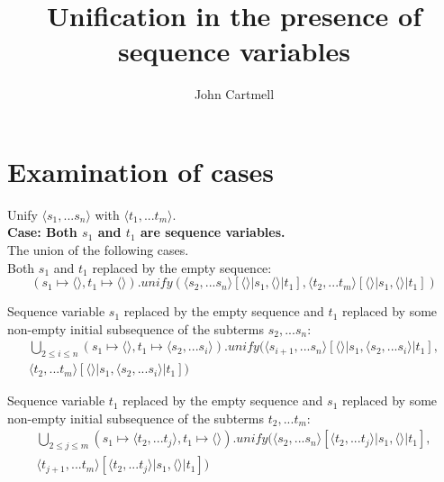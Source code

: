 \documentclass[10pt,a4paper,fleqn]{article}
\title{Unification in the presence of sequence variables}
\author{John Cartmell}
\begin{document}
\maketitle


\section{Examination of cases}

Unify $\langle s_1,...s_n \rangle$ with  $\langle t_1,...t_m \rangle$. \\

\noindent
\textbf{Case: Both $s_1$  and $t_1$ are sequence variables.} \\

\noindent
The union of the following cases. \\

\noindent
Both $s_1$ and $t_1$  replaced by the empty sequence:
\begin{equation}
\label{s1emptyt1empty}
 (s_1 \mapsto \langle \rangle,t_1 \mapsto \langle \rangle)
      .unify(\langle s_2,...s_n \rangle[\langle \rangle|s_1, \langle \rangle|t_1],
             \langle t_2,...t_m \rangle[\langle \rangle|s_1, \langle \rangle|t_1]
						) 
\end{equation}

\noindent
Sequence variable $s_1$ replaced by the empty sequence and $t_1$ replaced by some non-empty 
initial subsequence of the subterms $s_2,...s_n$:
\begin{multline}
\label{s1emptyt1nonempty}
\bigcup_{2 \leq i \leq n}
(s_1 \mapsto \langle \rangle, 
 t_1 \mapsto \langle s_2,...s_i\rangle
)
.unify(\langle s_{i+1},...s_n \rangle
       [\langle \rangle|s_1, \langle s_2,...s_i \rangle|t_1], \\
        \langle t_2,...t_m \rangle[\langle \rangle|s_1, \langle s_2,...s_i \rangle|t_1]
						)
\end{multline}

\noindent
Sequence variable $t_1$ replaced by the empty sequence and $s_1$ replaced by some 
non-empty initial subsequence of the subterms $t_2,...t_m$:
\begin{multline}
\label{s1nonemptyt1empty}
\bigcup_{2 \leq j \leq m}
(s_1 \mapsto \langle t_2,...t_j \rangle, 
 t_1 \mapsto \langle \rangle
)
.unify(\langle s_2,...s_n \rangle[\langle t_2,...t_j \rangle|s_1, \langle \rangle|t_1],\\
             \langle t_{j+1},...t_m \rangle[\langle t_2,...t_j \rangle|s_1, \langle \rangle|t_1]
						) 
\end{multline}
\end{document}

